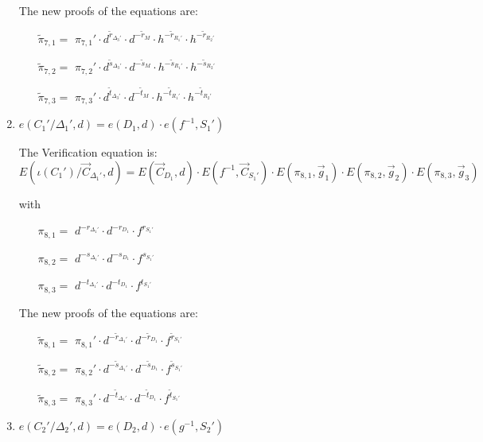\begin{description}
\begin{enumerate}
    The new proofs of the equations are:
    \begin{itemize}
    \item[$\tilde{\pi}_{7,1} = $] $\pi_{7,1}' \cdot d^{\tilde{r}_{\Delta_3'}} \cdot d^{-\tilde{r}_M} \cdot h^{-\tilde{r}_{R_1'}} \cdot h^{-\tilde{r}_{R_2'}}$
    \item[$\tilde{\pi}_{7,2} = $] $\pi_{7,2}' \cdot d^{\tilde{s}_{\Delta_3'}} \cdot d^{-\tilde{s}_M} \cdot h^{-\tilde{s}_{R_1'}} \cdot h^{-\tilde{s}_{R_2'}}$
    \item[$\tilde{\pi}_{7,3} = $] $\pi_{7,3}' \cdot d^{\tilde{t}_{\Delta_3'}} \cdot d^{-\tilde{t}_M} \cdot h^{-\tilde{t}_{R_1'}} \cdot h^{-\tilde{t}_{R_2'}}$
    \end{itemize}

    
  \item $e(C_1'/\boxed{\Delta_1'}, d) = e (\boxed{D_1},d) \cdot e(f^{-1}, \boxed{S_1'})$

    The Verification equation is: $ E(\iota(C_1')/\vec{C}_{\Delta_1'}, d) = E(\vec{C}_{D_1},d) \cdot E(f^{-1}, \vec{C}_{S_1'})\cdot E(\pi_{8,1}, \vec{g}_1)\cdot E(\pi_{8,2}, \vec{g}_2)\cdot E(\pi_{8,3}, \vec{g}_3)$

    with
    \begin{itemize}
    \item[$\pi_{8,1} = $] $d^{-r_{\Delta_1'}} \cdot d^{-r_{D_1}} \cdot f^{r_{S_1'}}$
    \item[$\pi_{8,2} = $] $d^{-s_{\Delta_1'}} \cdot d^{-s_{D_1}} \cdot f^{s_{S_1'}}$
    \item[$\pi_{8,3} = $] $d^{-t_{\Delta_1'}} \cdot d^{-t_{D_1}} \cdot f^{t_{S_1'}}$
    \end{itemize}

    The new proofs of the equations are:
    
    \begin{itemize}
    \item[$\tilde{\pi}_{8,1} = $] $\pi_{8,1}' \cdot d^{-\tilde{r}_{\Delta_1'}} \cdot d^{-\tilde{r}_{D_1}} \cdot f^{\tilde{r}_{S_1'}}$
    \item[$\tilde{\pi}_{8,2} = $] $\pi_{8,2}' \cdot d^{-\tilde{s}_{\Delta_1'}} \cdot d^{-\tilde{s}_{D_1}} \cdot f^{\tilde{s}_{S_1'}}$
    \item[$\tilde{\pi}_{8,3} = $] $\pi_{8,3}' \cdot d^{-\tilde{t}_{\Delta_1'}} \cdot d^{-\tilde{t}_{D_1}} \cdot f^{\tilde{t}_{S_1'}}$
    \end{itemize}

    
  \item $e(C_2'/\boxed{\Delta_2'}, d) = e (\boxed{D_2},d) \cdot e(g^{-1}, \boxed{S_2'})$


\end{enumerate}
\end{description}
